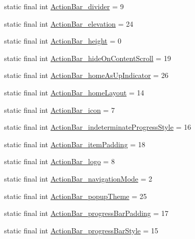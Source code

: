\begin{DoxyCompactItemize}
static final int \hyperlink{classproject4_1_1xaria_1_1R_1_1styleable_aa7f5948a8f73f6442f4be22fae96c835}{Action\+Bar\+\_\+divider} = 9
\item 
static final int \hyperlink{classproject4_1_1xaria_1_1R_1_1styleable_a538cdc9cda0d9026935ab8949327a1a4}{Action\+Bar\+\_\+elevation} = 24
\item 
static final int \hyperlink{classproject4_1_1xaria_1_1R_1_1styleable_acac776d934e00d7cc5f0250a0d027a24}{Action\+Bar\+\_\+height} = 0
\item 
static final int \hyperlink{classproject4_1_1xaria_1_1R_1_1styleable_a7689152e199aa4b0e5ce73fa3c45f32e}{Action\+Bar\+\_\+hide\+On\+Content\+Scroll} = 19
\item 
static final int \hyperlink{classproject4_1_1xaria_1_1R_1_1styleable_ab5053df37af5d2ea8d603211b589c775}{Action\+Bar\+\_\+home\+As\+Up\+Indicator} = 26
\item 
static final int \hyperlink{classproject4_1_1xaria_1_1R_1_1styleable_a3c2746f97e4f1d93ae4fd7b0a94e055c}{Action\+Bar\+\_\+home\+Layout} = 14
\item 
static final int \hyperlink{classproject4_1_1xaria_1_1R_1_1styleable_ac5aaeb633d4d1312de58e956afac37b1}{Action\+Bar\+\_\+icon} = 7
\item 
static final int \hyperlink{classproject4_1_1xaria_1_1R_1_1styleable_a7b820690f429621509300f757ddbd3da}{Action\+Bar\+\_\+indeterminate\+Progress\+Style} = 16
\item 
static final int \hyperlink{classproject4_1_1xaria_1_1R_1_1styleable_afead372bec08fa28b16df291eceff099}{Action\+Bar\+\_\+item\+Padding} = 18
\item 
static final int \hyperlink{classproject4_1_1xaria_1_1R_1_1styleable_a29368a7dcfad1ef0f8e7537d44b3cf41}{Action\+Bar\+\_\+logo} = 8
\item 
static final int \hyperlink{classproject4_1_1xaria_1_1R_1_1styleable_a8a75ec93401c4f373036ed6d0abe042e}{Action\+Bar\+\_\+navigation\+Mode} = 2
\item 
static final int \hyperlink{classproject4_1_1xaria_1_1R_1_1styleable_af32e42a2ea26936b7608c41f68c9ae51}{Action\+Bar\+\_\+popup\+Theme} = 25
\item 
static final int \hyperlink{classproject4_1_1xaria_1_1R_1_1styleable_a99f4af768ba3206b1224f0599aad5fd3}{Action\+Bar\+\_\+progress\+Bar\+Padding} = 17
\item 
static final int \hyperlink{classproject4_1_1xaria_1_1R_1_1styleable_ae3f1ea6ff103725e559077f1effcb813}{Action\+Bar\+\_\+progress\+Bar\+Style} = 15

\end{DoxyCompactItemize}
